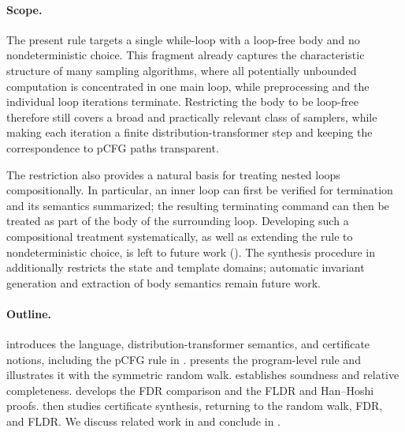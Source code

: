 \paragraph{Scope.}
The present rule targets a single while-loop with a loop-free body and no nondeterministic choice. This fragment already captures the characteristic structure of many sampling algorithms, where all potentially unbounded computation is concentrated in one main loop, while preprocessing and the individual loop iterations terminate. Restricting the body to be loop-free therefore still covers a broad and practically relevant class of samplers, while making each iteration a finite distribution-transformer step and keeping the correspondence to pCFG paths transparent.

The restriction also provides a natural basis for treating nested loops compositionally. In particular, an inner loop can first be verified for termination and its semantics summarized; the resulting terminating command can then be treated as part of the body of the surrounding loop. Developing such a compositional treatment systematically, as well as extending the rule to nondeterministic choice, is left to future work (). The synthesis procedure in  additionally restricts the state and template domains; automatic invariant generation and extraction of body semantics remain future work.

\paragraph{Outline.}
 introduces the language, distribution-transformer semantics, and certificate notions, including the pCFG rule in .  presents the program-level rule and illustrates it with the symmetric random walk.  establishes soundness and relative completeness.  develops the FDR comparison and the FLDR and Han--Hoshi proofs.  then studies certificate synthesis, returning to the random walk, FDR, and FLDR. We discuss related work in  and conclude in .
